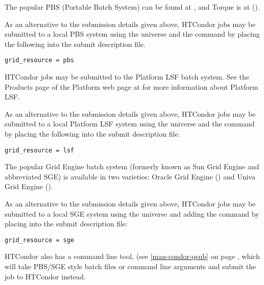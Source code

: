 
The popular PBS (Portable Batch System) can be found at
,
and Torque is at
().

As an alternative to the submission details given above,
HTCondor jobs may be submitted to a local PBS system
using the  universe and the
 command by placing the following
into the submit description file.
\begin{verbatim}
grid_resource = pbs
\end{verbatim}




HTCondor jobs may be submitted to the Platform LSF batch system.
See the Products page of the Platform web page at
for more information about Platform LSF.

As an alternative to the submission details given above,
HTCondor jobs may be submitted to a local Platform LSF system
using the  universe and the
 command  by placing the following
into the submit description file.
\begin{verbatim}
grid_resource = lsf
\end{verbatim}




The popular Grid Engine batch system (formerly known as Sun Grid Engine and
abbreviated SGE) is available in two varieties:
Oracle Grid Engine
()
and Univa Grid Engine
().

As an alternative to the submission details given above,
HTCondor jobs may be submitted to a local SGE system
using the  universe and adding the
 command by placing
into the submit description file:
\begin{verbatim}
grid_resource = sge
\end{verbatim}


HTCondor also has a command line tool,  (see \ref{man-condor-qsub} 
on page \pageref{man-condor-qsub}, which will take PBS/SGE style batch files or 
command line arguments and submit the job to HTCondor instead.
